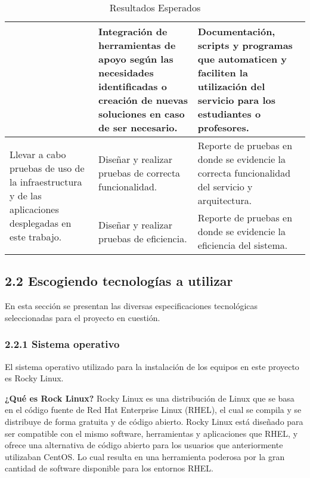 \begin{doublespace}
\begin{table}[ht]
\begin{tabular}{m{4.6cm}m{4.6cm}m{4.6cm}}
                                                                           &
      Integración de herramientas de apoyo según las necesidades identificadas o creación de nuevas soluciones en caso de ser necesario.            &
      Documentación, scripts y programas que automaticen y faciliten la utilización del servicio para los estudiantes o profesores.                                                               \\
      \hline
      \multirow{2}{4.3cm}{Llevar a cabo pruebas de uso de la infraestructura y de las aplicaciones desplegadas en este trabajo.}            &
      Diseñar y realizar pruebas de correcta funcionalidad.                                                         &
      Reporte de pruebas en donde se evidencie la correcta funcionalidad del servicio y arquitectura.
      \\ \cline{2-3}
                                                                           &
      Diseñar y realizar pruebas de eficiencia.            &
      Reporte de pruebas en donde se evidencie la eficiencia del sistema.                                                              \\
      \hline
    \end{tabular}
    \caption{Resultados Esperados}
    \label{table:table4}
  \end{table}

\begin{multicols}{2}

    \subsection{2.2 Escogiendo tecnologías a utilizar}
    En esta sección se presentan las diversas especificaciones tecnológicas seleccionadas para el proyecto en cuestión.

    \subsubsection{2.2.1 Sistema operativo}
    El sistema operativo utilizado para la instalación de los equipos en este proyecto es Rocky Linux.

    \textbf{¿Qué es Rock Linux?}
    \newline
    Rocky Linux es una distribución de Linux que se basa en el código fuente de Red Hat Enterprise Linux (RHEL), el cual se compila y se distribuye de forma gratuita y de código abierto. Rocky Linux está diseñado para ser compatible con el mismo software, herramientas y aplicaciones que RHEL, y ofrece una alternativa de código abierto para los usuarios que anteriormente utilizaban CentOS. Lo cual resulta en una herramienta poderosa por la gran cantidad de software disponible para los entornos RHEL.


\end{multicols}
\end{doublespace}

